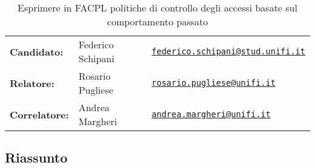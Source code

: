 \documentclass{article}
\begin{document}
\begin{table}[]
\centering
\caption*{Esprimere in FACPL politiche di controllo degli accessi basate sul comportamento passato}
\begin{tabular}{lll}
\textbf{Candidato:}   & Federico Schipani & \href{mailto:federico.schipani@stud.unifi.it}{\texttt{federico.schipani@stud.unifi.it}}  \\
\textbf{Relatore:}    & Rosario Pugliese  & \href{mailto:rosario.pugliese@unifi.it}{\texttt{rosario.pugliese@unifi.it}}                           \\
\textbf{Correlatore:} & Andrea Margheri   & \href{mailto:andrea.margheri@unifi.it}{\texttt{andrea.margheri@unifi.it}}                          
\end{tabular}
\end{table}
\subsection*{Riassunto}
 
\end{document}
